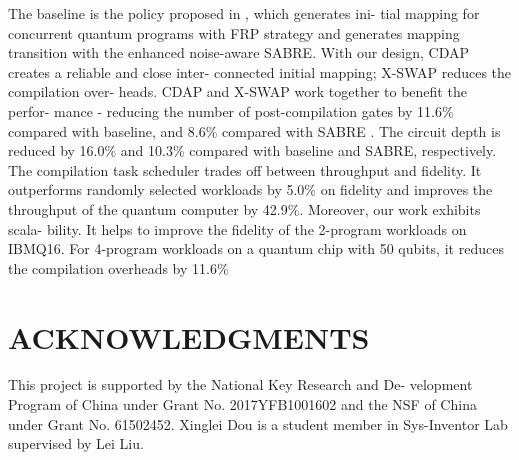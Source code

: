 \documentclass{article}
\begin{document}
	The baseline is the policy proposed in \cite{das2019case}, which generates ini-
	tial mapping for concurrent quantum programs with FRP strategy
	and generates mapping transition with the enhanced noise-aware
	SABRE. With our design, CDAP creates a reliable and close inter-
	connected initial mapping; X-SWAP reduces the compilation over-
	heads. CDAP and X-SWAP work together to benefit the perfor-
	mance - reducing the number of post-compilation gates by 11.6\%
	compared with baseline, and 8.6\% compared with SABRE \cite{li2019tackling}. The
	circuit depth is reduced by 16.0\% and 10.3\% compared with baseline
	and SABRE, respectively. The compilation task scheduler trades off
	between throughput and fidelity. It outperforms randomly selected
	workloads by 5.0\% on fidelity and improves the throughput of the
	quantum computer by 42.9\%. Moreover, our work exhibits scala-
	bility. It helps to improve the fidelity of the 2-program workloads
	on IBMQ16. For 4-program workloads on a quantum chip with 50
	qubits, it reduces the compilation overheads by 11.6\%
	
	\section*{ACKNOWLEDGMENTS}
	This project is supported by the National Key Research and De-
	velopment Program of China under Grant No. 2017YFB1001602
	and the NSF of China under Grant No. 61502452. Xinglei Dou is a
	student member in Sys-Inventor Lab supervised by Lei Liu.
	
	
	
\end{document}
